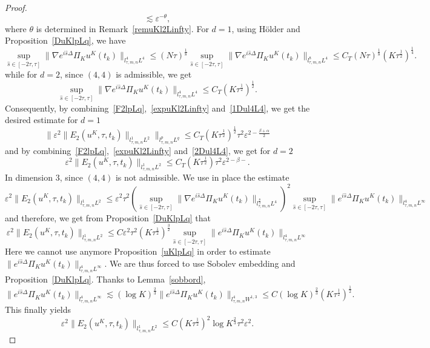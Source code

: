 \documentclass[10pt,a4paper]{article}
\begin{document}
\begin{proof}
\begin{equation}
      \lesssim \varepsilon^{-\theta},
    \end{equation}
    where \(\theta\) is determined in Remark~\ref{remuKl2Linfty}.
    For \(d=1\), using H\"older and Proposition~\ref{DuKlpLq}, we have
    \begin{equation}\label{1Dul4L4}
      \sup_{\hat{s} \in [-2\tau,\tau]} \|\nabla e^{i\hat{s}\Delta}\Pi_K u^K(t_k)\|_{l^4_{\tau,m,n}L^4}
    \leq (N\tau)^\frac18 \sup_{\hat{s} \in [-2\tau,\tau]} \|\nabla e^{i\hat{s}\Delta}\Pi_K u^K(t_k)\|_{l^8_{\tau,m,n}L^4}
    \leq C_T (N\tau)^\frac18 (K\tau^\frac12)^\frac14.
    \end{equation}
    while for \(d=2\), since \((4,4)\) is admissible, we get 
    \begin{equation}\label{2Dul4L4}
      \sup_{\hat{s} \in [-2\tau,\tau]} \|\nabla e^{i\hat{s}\Delta}\Pi_K u^K(t_k)\|_{l^4_{\tau,m,n}L^4}
    \leq C_T (K\tau^\frac12)^\frac12.
    \end{equation}
    Consequently, by combining~\eqref{F2lpLq},~\eqref{expuKl2Linfty} and~\eqref{1Dul4L4},
    we get the desired estimate for \(d=1\)
    \[ \|\varepsilon^2 \|E_2(u^K,\tau,t_k)\|_{l^1_{\tau,m,n}L^2}\|_{l^p_{\tau,m,n}L^q} 
    \leq C_T (K\tau^\frac12)^\frac12 \tau^2
    \varepsilon^{2-\frac{\beta+\alpha}2}
    \]
    and by combining~\eqref{F2lpLq},~\eqref{expuKl2Linfty} and~\eqref{2Dul4L4},
    we get for \(d=2\)
    \[ \varepsilon^2 \|E_2(u^K,\tau,t_k)\|_{l^1_{\tau,m,n}L^2}
    \leq C_T (K\tau^\frac12) \tau^2 \varepsilon^{2-\beta-} . \]
    In dimension \(3\), since \((4,4)\) is not admissible. We use in place the
    estimate 
    \begin{equation}
      \varepsilon^2 \|E_2(u^K,\tau,t_k)\|_{l^1_{\tau,m,n}L^2} \leq \varepsilon^2 \tau^2
      \left(\sup_{\hat s \in [-2\tau, \tau]} 
      \|\nabla e^{i\hat s\Delta}\Pi_{K}u^K(t_k)\|_{l^\frac83_{\tau,m,n}L^4} \right)^2 
      \sup_{\hat s \in [-2\tau, \tau]} \|e^{i\hat s\Delta }\Pi_K u^K(t_k)\|_{l^4_{\tau,m,n}L^\infty}
    \end{equation}
    and therefore, we get from Proposition~\ref{DuKlpLq} that 
    \[ \varepsilon^2 \|E_2(u^K,\tau,t_k)\|_{l^1_{\tau,m,n}L^2} \leq C \varepsilon^2 \tau^2
    (K\tau^\frac12)^\frac32 
    \sup_{\hat s \in [-2\tau, \tau]} \|e^{i\hat s\Delta }\Pi_K u^K(t_k)\|_{l^4_{\tau,m,n}L^\infty} \]
    Here we cannot use anymore Proposition~\ref{uKlpLq} in order to estimate 
    \(\|e^{i \hat s\Delta }\Pi_{K} u^K(t_{k})\|_{l^4_{\tau,m,n}L^\infty}\). We 
    are thus forced to use Sobolev embedding and Proposition~\ref{DuKlpLq}. 
    Thanks to Lemma~\ref{sobbord}, 
    \[ \|e^{i\hat s\Delta }\Pi_K u^K(t_k)\|_{l^4_{\tau,m,n}L^\infty} \lesssim 
    (\log K)^\frac23 \|e^{i\hat s\Delta }\Pi_K u^K(t_k)\|_{l^4_{\tau,m,n}W^{1,3}}
    \leq C (\log K)^\frac23 (K\tau^\frac12)^\frac12 .\]
    This finally yields 
    \[ \varepsilon^2 \|E_2(u^K,\tau,t_k)\|_{l^1_{\tau,m,n}L^2} \leq C (K\tau^\frac12)^2 \log{K}^\frac23
    \tau^2 \varepsilon^2.\]
  \end{proof}
\end{document}
